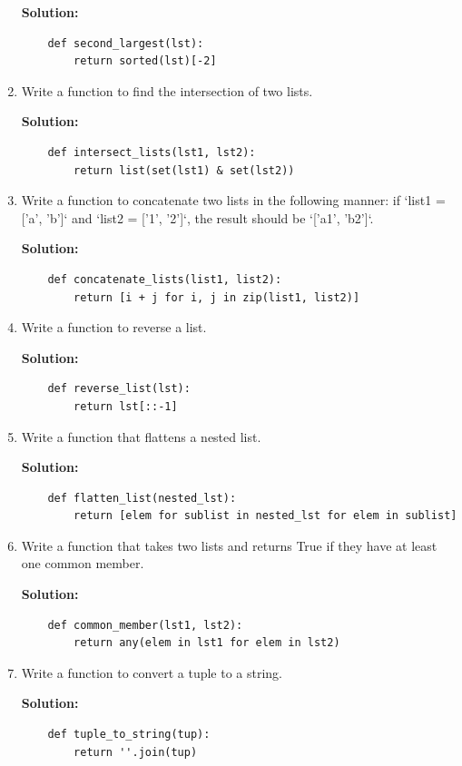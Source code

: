 \documentclass[12pt]{book}
\begin{document}
\begin{enumerate}
    \textbf{Solution:}
    \begin{lstlisting}
    def second_largest(lst):
        return sorted(lst)[-2]
    \end{lstlisting}

    \item  Write a function to find the intersection of two lists.

    \textbf{Solution:}
    \begin{lstlisting}
    def intersect_lists(lst1, lst2):
        return list(set(lst1) & set(lst2))
    \end{lstlisting}

    \item  Write a function to concatenate two lists in the following manner: if `list1 = ['a', 'b']` and `list2 = ['1', '2']`, the result should be `['a1', 'b2']`.

    \textbf{Solution:}
    \begin{lstlisting}
    def concatenate_lists(list1, list2):
        return [i + j for i, j in zip(list1, list2)]
    \end{lstlisting}
    
    \item  Write a function to reverse a list.

    \textbf{Solution:}
    \begin{lstlisting}
    def reverse_list(lst):
        return lst[::-1]
    \end{lstlisting}

    \item  Write a function that flattens a nested list.

    \textbf{Solution:}
    \begin{lstlisting}
    def flatten_list(nested_lst):
        return [elem for sublist in nested_lst for elem in sublist]
    \end{lstlisting}

    \item  Write a function that takes two lists and returns True if they have at least one common member.

    \textbf{Solution:}
    \begin{lstlisting}
    def common_member(lst1, lst2):
        return any(elem in lst1 for elem in lst2)
    \end{lstlisting}

    \item  Write a function to convert a tuple to a string.

    \textbf{Solution:}
    \begin{lstlisting}
    def tuple_to_string(tup):
        return ''.join(tup)
    \end{lstlisting}


\end{enumerate}
\end{document}

